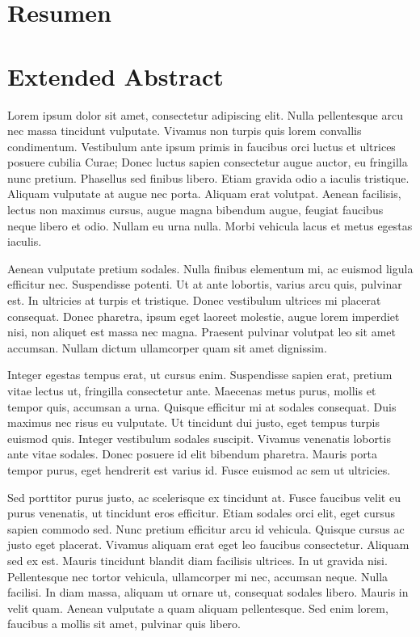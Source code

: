 \section*{Resumen}

\section*{Extended Abstract}


Lorem ipsum dolor sit amet, consectetur adipiscing elit. Nulla pellentesque arcu nec massa tincidunt vulputate. Vivamus non turpis quis lorem convallis condimentum. Vestibulum ante ipsum primis in faucibus orci luctus et ultrices posuere cubilia Curae; Donec luctus sapien consectetur augue auctor, eu fringilla nunc pretium. Phasellus sed finibus libero. Etiam gravida odio a iaculis tristique. Aliquam vulputate at augue nec porta. Aliquam erat volutpat. Aenean facilisis, lectus non maximus cursus, augue magna bibendum augue, feugiat faucibus neque libero et odio. Nullam eu urna nulla. Morbi vehicula lacus et metus egestas iaculis.

Aenean vulputate pretium sodales. Nulla finibus elementum mi, ac euismod ligula efficitur nec. Suspendisse potenti. Ut at ante lobortis, varius arcu quis, pulvinar est. In ultricies at turpis et tristique. Donec vestibulum ultrices mi placerat consequat. Donec pharetra, ipsum eget laoreet molestie, augue lorem imperdiet nisi, non aliquet est massa nec magna. Praesent pulvinar volutpat leo sit amet accumsan. Nullam dictum ullamcorper quam sit amet dignissim.

Integer egestas tempus erat, ut cursus enim. Suspendisse sapien erat, pretium vitae lectus ut, fringilla consectetur ante. Maecenas metus purus, mollis et tempor quis, accumsan a urna. Quisque efficitur mi at sodales consequat. Duis maximus nec risus eu vulputate. Ut tincidunt dui justo, eget tempus turpis euismod quis. Integer vestibulum sodales suscipit. Vivamus venenatis lobortis ante vitae sodales. Donec posuere id elit bibendum pharetra. Mauris porta tempor purus, eget hendrerit est varius id. Fusce euismod ac sem ut ultricies.

Sed porttitor purus justo, ac scelerisque ex tincidunt at. Fusce faucibus velit eu purus venenatis, ut tincidunt eros efficitur. Etiam sodales orci elit, eget cursus sapien commodo sed. Nunc pretium efficitur arcu id vehicula. Quisque cursus ac justo eget placerat. Vivamus aliquam erat eget leo faucibus consectetur. Aliquam sed ex est. Mauris tincidunt blandit diam facilisis ultrices. In ut gravida nisi. Pellentesque nec tortor vehicula, ullamcorper mi nec, accumsan neque. Nulla facilisi. In diam massa, aliquam ut ornare ut, consequat sodales libero. Mauris in velit quam. Aenean vulputate a quam aliquam pellentesque. Sed enim lorem, faucibus a mollis sit amet, pulvinar quis libero.

